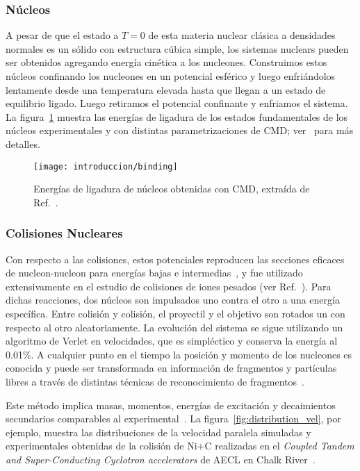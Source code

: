 \subsubsection{Núcleos}
A pesar de que el estado a $T=0$ de esta materia nuclear clásica a densidades normales es un sólido con estructura cúbica simple, los sistemas nuclears pueden ser obtenidos agregando energía cinética a los nucleones.
Construimos estos núcleos confinando los nucleones en un potencial esférico y luego enfriándolos lentamente desde una temperatura elevada hasta que llegan a un estado de equilibrio ligado.
Luego retiramos el potencial confinante y enfriamos el sistema.
La figura~\ref{fig:int_binding} muestra las energías de ligadura de los estados fundamentales de los núcleos experimentales y con distintas parametrizaciones de CMD; ver~\cite{alcain_dynamics_2017} para más detalles.

\begin{figure}[h]
  \centering
  \texttt{[image: introduccion/binding]}
  \caption{Energías de ligadura de núcleos obtenidas con CMD, extraída de Ref.~\cite{alcain_dynamics_2017}.}
\label{fig:int_binding}
\end{figure}

\subsubsection{Colisiones Nucleares}
Con respecto a las colisiones, estos potenciales reproducen las secciones eficaces de nucleon-nucleon para energías bajas e intermedias~\cite{lenk_accuracy_1990}, y fue utilizado extensivamente en el estudio de colisiones de iones pesados (ver Ref.~\cite{chernomoretz_quasiclassical_2002, barranon_time_2007}).
Para dichas reacciones, dos núcleos son impulsados uno contra el otro a una energía específica.
Entre colisión y colisión, el proyectil y el objetivo son rotados un con respecto al otro aleatoriamente.
La evolución del sistema se sigue utilizando un algoritmo de Verlet en velocidades, que es simpléctico y conserva la energía al 0.01\%.
A cualquier punto en el tiempo la posición y momento de los nucleones es conocida y puede ser transformada en información de fragmentos y partículas libres a través de distintas técnicas de reconocimiento de fragmentos~\cite{dorso_early_1993, dorso_when_1995, strachan_time_1997}.

Este método implica masas, momentos, energías de excitación y decaimientos secundarios comparables al experimental~\cite{belkacem_searching_1996,chernomoretz_quasiclassical_2002}.
La figura~\ref{fig:distribution_vel}, por ejemplo, muestra las distribuciones de la velocidad paralela simuladas y experimentales obtenidas de la colisión de $\text{Ni+C}$ realizadas en el \emph{Coupled Tandem and Super-Conducting Cyclotron accelerators} de AECL en Chalk River~\cite{chernomoretz_quasiclassical_2002}.

